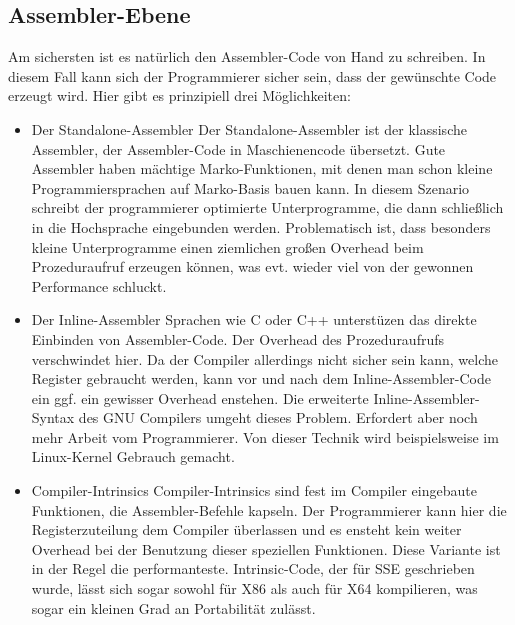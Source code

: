 \documentclass[a4paper,10pt]{article}
\begin{document}
\subsection{Assembler-Ebene}

Am sichersten ist es natürlich den Assembler-Code von Hand zu schreiben. In diesem Fall kann sich der Programmierer
sicher sein, dass der gewünschte Code erzeugt wird. Hier gibt es prinzipiell drei Möglichkeiten:

\begin{itemize}

    \item{Der Standalone-Assembler} Der Standalone-Assembler ist der klassische Assembler, der
    Assembler-Code in Maschienencode übersetzt. Gute Assembler haben mächtige Marko-Funktionen, mit
    denen man schon kleine Programmiersprachen auf Marko-Basis bauen kann. In diesem Szenario
    schreibt der programmierer optimierte Unterprogramme, die dann schließlich in die Hochsprache
    eingebunden werden. Problematisch ist, dass besonders kleine Unterprogramme einen ziemlichen
    großen Overhead beim Prozeduraufruf erzeugen können, was evt. wieder viel von der gewonnen
    Performance schluckt.

    \item{Der Inline-Assembler} Sprachen wie C oder C++ unterstüzen das direkte Einbinden von
    Assembler-Code.  Der Overhead des Prozeduraufrufs verschwindet hier. Da der Compiler allerdings
    nicht sicher sein kann, welche Register gebraucht werden, kann vor und nach dem
    Inline-Assembler-Code ein ggf. ein gewisser Overhead enstehen. Die erweiterte
    Inline-Assembler-Syntax des GNU Compilers umgeht dieses Problem. Erfordert aber noch mehr Arbeit
    vom Programmierer. Von dieser Technik wird beispielsweise im Linux-Kernel Gebrauch gemacht.

    \item{Compiler-Intrinsics} Compiler-Intrinsics sind fest im Compiler eingebaute Funktionen, die
    Assembler-Befehle kapseln. Der Programmierer kann hier die Registerzuteilung dem Compiler
    überlassen und es ensteht kein weiter Overhead bei der Benutzung dieser speziellen Funktionen.
    Diese Variante ist in der Regel die performanteste.  Intrinsic-Code, der für SSE geschrieben
    wurde, lässt sich sogar sowohl für X86 als auch für X64 kompilieren, was sogar ein kleinen Grad
    an Portabilität zulässt.

\end{itemize}
\end{document}
